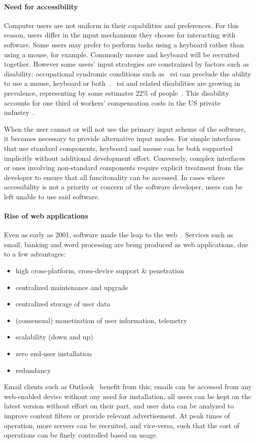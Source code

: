 \documentclass[a4paper, 12pt]{report}
\begin{document}
\paragraph{Need for accessibility}
Computer users are not uniform in their capabilities and preferences. For this reason, users differ in the input mechanisms they choose for interacting with software. Some users may prefer to perform tasks using a keyboard rather than using a mouse, for example. Commonly mouse and keyboard will be recruited together. However some users' input strategies are constrained by factors such as disability: occupational syndromic conditions such as ~\gls{rsi} can preclude the ability to use a mouse, keyboard or both~\cite{trewin1999keyboard}. ~\gls{rsi} and related disabilities are growing in prevalence, representing by some estimates 22\% of people~\cite{rsiprevalence}. This disability accounts for one third of workers' compensation costs in the US private industry~\cite{barr2002pathophysiological}.

When the user cannot or will not use the primary input scheme of the software, it becomes necessary to provide alternative input modes. For simple interfaces that use standard components, keyboard and mouse can be both supported implicitly without additional development effort. Conversely, complex interfaces or ones involving non-standard components require explicit treatment from the developer to ensure that all funcitonality can be accessed. In cases where accessibility is not a priority or concern of the software developer, users can be left unable to use said software.

\paragraph{Rise of web applications}
Even as early as 2001, software made the leap to the web~\cite{ginige2001web}. Services such as email, banking and word processing are being produced as web applications, due to a few advantages:
\begin{itemize}
  \item high cross-platform, cross-device support \& penetration
  \item centralized maintenance and upgrade
  \item centralized storage of user data
  \item (consensual) monetization of user information, telemetry
  \item scalability (down and up)
  \item zero end-user installation
  \item redundancy
\end{itemize}
Email clients such as Outlook~\cite{outlookcom} benefit from this; emails can be accessed from any web-enabled device without any need for installation, all users can be kept on the latest version without effort on their part, and user data can be analyzed to improve content filters or provide relevant advertisement. At peak times of operation, more servers can be recruited, and vice-versa, such that the cost of operations can be finely controlled based on usage.
\end{document}
